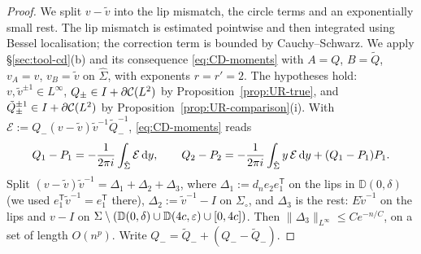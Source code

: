 \begin{proof}
We split $v-\tilde v$ into the lip mismatch, the circle terms and an exponentially small rest. The lip mismatch
is estimated pointwise and then integrated using Bessel localisation; the correction term is bounded by
Cauchy--Schwarz. We apply \S\ref{sec:tool-cd}(b) and its consequence \eqref{eq:CD-moments} with $A=Q$, $B=\tilde Q$, $v_A=v$, $v_B=\tilde v$ on
$\hat\Sigma$, with exponents $r=r'=2$. The hypotheses hold: $v,\tilde v^{\pm1}\in L^\infty$, $Q_\pm\in I+\partial\mathcal{C}(L^2)$ by
Proposition~\ref{prop:UR-true}, and $\tilde Q_\pm^{\pm1}\in I+\partial\mathcal{C}(L^2)$ by Proposition~\ref{prop:UR-comparison}(i). With
$\mathcal E:=Q_-(v-\tilde v)\tilde v^{-1}\tilde Q_-^{-1}$, \eqref{eq:CD-moments} reads
\[
  Q_1-P_1=-\frac1{2\pi i}\int_{\hat\Sigma}\mathcal E\,\mathrm{d} y,\qquad
  Q_2-P_2=-\frac1{2\pi i}\int_{\hat\Sigma}y\,\mathcal E\,\mathrm{d} y+(Q_1-P_1)P_1 .
\]
Split $(v-\tilde v)\tilde v^{-1}=\Delta_1+\Delta_2+\Delta_3$, where $\Delta_1:=d_ne_2e_1^{\mathsf T}$ on the lips in
$\mathbb D(0,\delta)$ (we used $e_1^{\mathsf T}\tilde v^{-1}=e_1^{\mathsf T}$ there), $\Delta_2:=\tilde v^{-1}-I$ on $\Sigma_{\circ}$, and
$\Delta_3$ is the rest: $E\tilde v^{-1}$ on the lips and $v-I$ on $\Sigma\setminus(\mathbb D(0,\delta)\cup \mathbb D(4c,\varepsilon)
\cup[0,4c])$. Then $\|\Delta_3\|_{L^\infty}\le Ce^{-n/C}$, on a set of length $O(n^p)$. Write $Q_-=\tilde Q_-+(Q_--\tilde
Q_-)$.


\end{proof}

